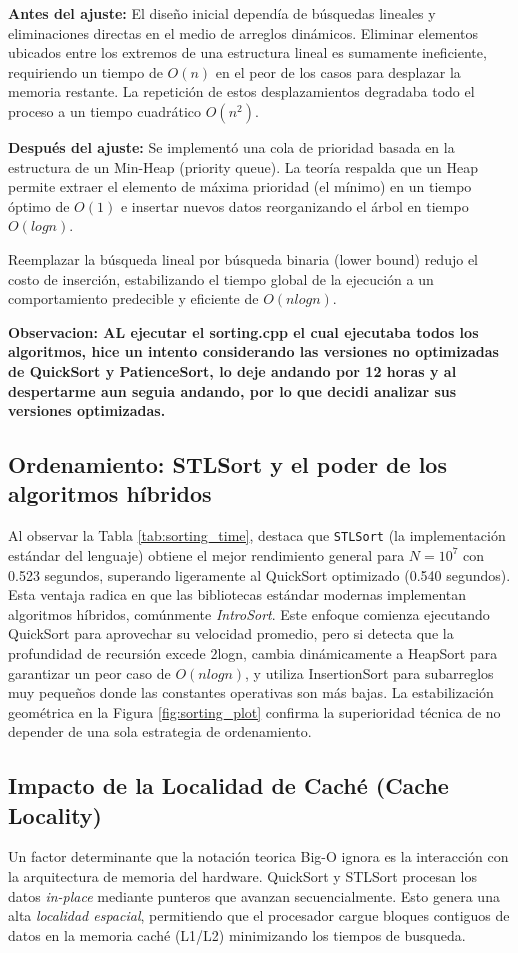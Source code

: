 \textbf{Antes del ajuste:} El diseño inicial dependía de búsquedas lineales y eliminaciones directas en el medio de arreglos dinámicos. Eliminar elementos ubicados entre los extremos de una estructura lineal es sumamente ineficiente, requiriendo un tiempo de $O(n)$ en el peor de los casos para desplazar la memoria restante. La repetición de estos desplazamientos degradaba todo el proceso a un tiempo cuadrático $O(n^2)$.  

\textbf{Después del ajuste:} Se implementó una cola de prioridad basada en la estructura de un Min-Heap (priority queue). La teoría respalda que un Heap permite extraer el elemento de máxima prioridad (el mínimo) en un tiempo óptimo de $O(1)$ e insertar nuevos datos reorganizando el árbol en tiempo $O(logn)$.

Reemplazar la búsqueda lineal por búsqueda binaria (lower bound) redujo el costo de inserción, estabilizando el tiempo global de la ejecución a un comportamiento predecible y eficiente de $O(nlogn)$.

\textbf{Observacion: AL ejecutar el sorting.cpp el cual ejecutaba todos los algoritmos, hice un intento considerando las versiones no optimizadas de QuickSort y PatienceSort, lo deje andando por 12 horas y al despertarme aun seguia andando, por lo que decidi analizar sus versiones optimizadas.}

\subsection{Ordenamiento: STLSort y el poder de los algoritmos híbridos}
Al observar la Tabla \ref{tab:sorting_time}, destaca que \texttt{STLSort} (la implementación estándar del lenguaje) obtiene el mejor rendimiento general para $N=10^7$
con 0.523 segundos, superando ligeramente al QuickSort optimizado (0.540 segundos). Esta ventaja radica en que las bibliotecas estándar modernas implementan algoritmos híbridos, comúnmente \textit{IntroSort}. Este enfoque comienza ejecutando QuickSort para aprovechar su velocidad promedio, pero si detecta que la profundidad de recursión excede 2logn, cambia dinámicamente a HeapSort para garantizar un peor caso de $O(nlogn)$, y utiliza InsertionSort para subarreglos muy pequeños donde las constantes operativas son más bajas. La estabilización geométrica en la Figura \ref{fig:sorting_plot} confirma la superioridad técnica de no depender de una sola estrategia de ordenamiento.

\subsection{Impacto de la Localidad de Caché (Cache Locality)}
Un factor determinante que la notación teorica Big-O ignora es la interacción con la arquitectura de memoria del hardware. QuickSort y STLSort procesan los datos \textit{in-place} mediante punteros que avanzan secuencialmente. Esto genera una alta \textit{localidad espacial}, permitiendo que el procesador cargue bloques contiguos de datos en la memoria caché (L1/L2) minimizando los tiempos de busqueda.

